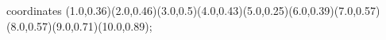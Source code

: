 					coordinates { (1.0,0.36)(2.0,0.46)(3.0,0.5)(4.0,0.43)(5.0,0.25)(6.0,0.39)(7.0,0.57)(8.0,0.57)(9.0,0.71)(10.0,0.89)};